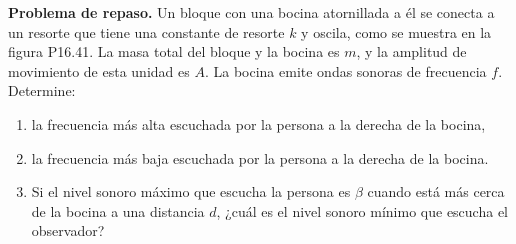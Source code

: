 \item \textbf{Problema de repaso.}
Un bloque con una bocina atornillada a él se conecta a un resorte que tiene una constante de resorte $k$ y oscila, como se muestra en la figura P16.41. La masa total del bloque y la bocina es $m$, y la amplitud de movimiento de esta unidad es $A$. La bocina emite ondas sonoras de frecuencia $f$. Determine:
\begin{enumerate}
    \item la frecuencia más alta escuchada por la persona a la derecha de la bocina,
    \item la frecuencia más baja escuchada por la persona a la derecha de la bocina.
    \item Si el nivel sonoro máximo que escucha la persona es $\beta$ cuando está más cerca de la bocina a una distancia $d$, ¿cuál es el nivel sonoro mínimo que escucha el observador?
\end{enumerate}